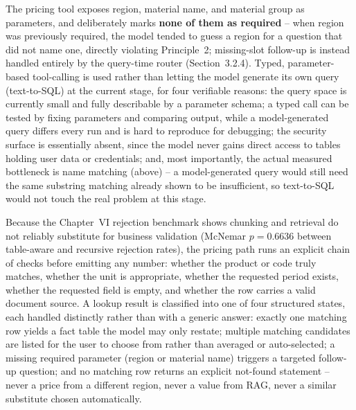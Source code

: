 \documentclass[11pt,a4paper]{article}
\begin{document}
The pricing tool exposes region, material name, and material group as
parameters, and deliberately marks \textbf{none of them as required} -- when
region was previously required, the model tended to guess a region for a
question that did not name one, directly violating Principle~2; missing-slot
follow-up is instead handled entirely by the query-time router
(Section~3.2.4). Typed, parameter-based tool-calling is used rather than
letting the model generate its own query (text-to-SQL) at the current stage,
for four verifiable reasons: the query space is currently small and fully
describable by a parameter schema; a typed call can be tested by fixing
parameters and comparing output, while a model-generated query differs every
run and is hard to reproduce for debugging; the security surface is
essentially absent, since the model never gains direct access to tables
holding user data or credentials; and, most importantly, the actual measured
bottleneck is name matching (above) -- a model-generated query would still
need the same substring matching already shown to be insufficient, so
text-to-SQL would not touch the real problem at this stage.

Because the Chapter~VI rejection benchmark shows chunking and retrieval do
not reliably substitute for business validation (McNemar $p=0.6636$ between
table-aware and recursive rejection rates), the pricing path runs an
explicit chain of checks before emitting any number: whether the product or
code truly matches, whether the unit is appropriate, whether the requested
period exists, whether the requested field is empty, and whether the row
carries a valid document source. A lookup result is classified into one of
four structured states, each handled distinctly rather than with a generic
answer: exactly one matching row yields a fact table the model may only
restate; multiple matching candidates are listed for the user to choose from
rather than averaged or auto-selected; a missing required parameter (region
or material name) triggers a targeted follow-up question; and no matching
row returns an explicit not-found statement -- never a price from a
different region, never a value from RAG, never a similar substitute chosen
automatically.
\end{document}
